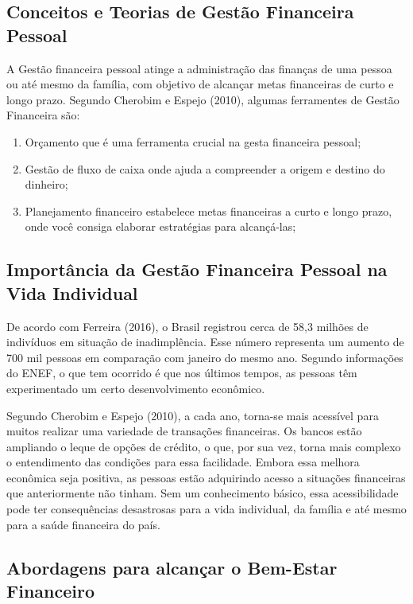\subsection{Conceitos e Teorias de Gestão Financeira Pessoal}

A Gestão financeira pessoal atinge a administração das finanças de uma pessoa ou até mesmo da família, com objetivo de alcançar metas financeiras de curto e longo prazo.
Segundo Cherobim e Espejo (2010), algumas ferramentes de Gestão Financeira são:

\begin{enumerate}
    \item Orçamento que é uma ferramenta crucial na gesta financeira pessoal;
    \item Gestão de fluxo de caixa onde ajuda a compreender a origem e destino do dinheiro;
    \item Planejamento financeiro estabelece metas financeiras a curto e longo prazo, onde você consiga elaborar estratégias para alcançá-las;
\end{enumerate}

\subsection{Importância da Gestão Financeira Pessoal na Vida Individual}

\nocite{ferreira2017importancia}
De acordo com Ferreira (2016), o Brasil registrou cerca de 58,3 milhões de indivíduos em situação de inadimplência. Esse número representa um aumento de 700 mil pessoas em comparação com janeiro do mesmo ano. Segundo informações do ENEF, o que tem ocorrido é que nos últimos tempos, as pessoas têm experimentado um certo desenvolvimento econômico.

Segundo Cherobim e Espejo (2010), a cada ano, torna-se mais acessível para muitos realizar uma variedade de transações financeiras. Os bancos estão ampliando o leque de opções de crédito, o que, por sua vez, torna mais complexo o entendimento das condições para essa facilidade. Embora essa melhora econômica seja positiva, as pessoas estão adquirindo acesso a situações financeiras que anteriormente não tinham. Sem um conhecimento básico, essa acessibilidade pode ter consequências desastrosas para a vida individual, da família e até mesmo para a saúde financeira do país.

\subsection{Abordagens para alcançar o Bem-Estar Financeiro}

